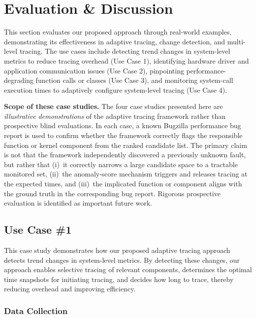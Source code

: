 \documentclass[pdflatex,sn-nature]{sn-jnl}%
\theoremstyle{thmstyleone}%
\theoremstyle{thmstyletwo}%
\theoremstyle{thmstylethree}%
\begin{document}
\section{Evaluation \& Discussion} \label{results}
This section evaluates our proposed approach through real-world examples, demonstrating its effectiveness in adaptive tracing, change detection, and multi-level tracing. The use cases include detecting trend changes in system-level metrics to reduce tracing overhead (Use Case 1), identifying hardware driver and application communication issues (Use Case 2), pinpointing performance-degrading function calls or classes (Use Case 3), and monitoring system-call execution times to adaptively configure system-level tracing (Use Case 4).

\textbf{Scope of these case studies.} The four case studies presented here are \emph{illustrative demonstrations} of the adaptive tracing framework rather than prospective blind evaluations. In each case, a known Bugzilla performance bug report is used to confirm whether the framework correctly flags the responsible function or kernel component from the ranked candidate list. The primary claim is not that the framework independently discovered a previously unknown fault, but rather that (i)~it correctly narrows a large candidate space to a tractable monitored set, (ii)~the anomaly-score mechanism triggers and releases tracing at the expected times, and (iii)~the implicated function or component aligns with the ground truth in the corresponding bug report. Rigorous prospective evaluation is identified as important future work.

\subsection{Use Case \#1}\label{case studies & evaluation: case study 1}
This case study demonstrates how our proposed adaptive tracing approach detects trend changes in system-level metrics. By detecting these changes, our approach enables selective tracing of relevant components, determines the optimal time snapshots for initiating tracing, and decides how long to trace, thereby reducing overhead and improving efficiency.




\subsubsection{Data Collection}\label{case studies & evaluation: data collection & generation}
\end{document}
